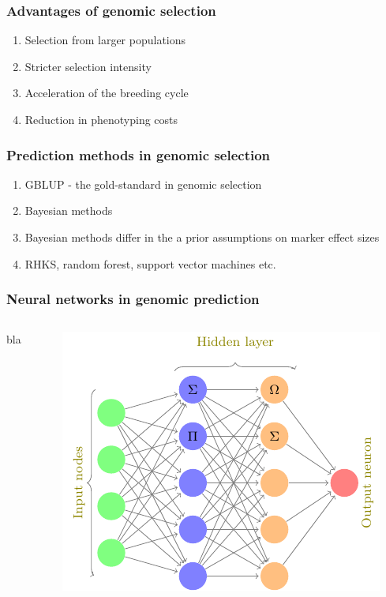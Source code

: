 \documentclass{beamer}
\begin{document}
\begin{frame}
  \frametitle{Advantages of genomic selection}
  \begin{enumerate}[<+->]
  \item Selection from larger populations
  \item Stricter selection intensity 
  \item Acceleration of the breeding cycle
  \item Reduction in phenotyping costs
  \end{enumerate}
\end{frame}


\begin{frame}
  \frametitle{Prediction methods in genomic selection}
  \begin{enumerate}[<+->]
  \item GBLUP - the gold-standard in genomic selection
  \item Bayesian methods
  \item Bayesian methods differ in the a prior assumptions on marker effect sizes
  \item RHKS, random forest, support vector machines etc.
  \end{enumerate}    
\end{frame}
 

\begin{frame}
   \frametitle{Neural networks in genomic prediction}
   \begin{columns}
     \begin{column}{0.5\textwidth}
       bla
     \end{column}
     \begin{column}{0.5\textwidth}
        \includegraphics[height=.6\textheight,width=.9\textwidth]{neuralnet}
     \end{column}
   \end{columns}
\end{frame}
 
\end{document}
